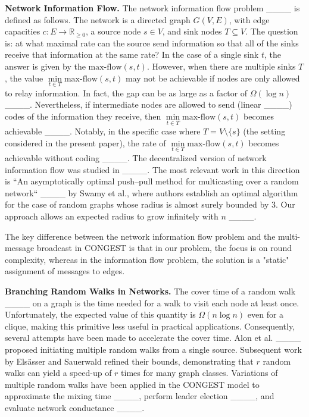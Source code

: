     
    \textbf{Network Information Flow.} The network information flow problem ____ is defined as follows. The network is a directed graph $G(V, E)$, with edge capacities $c: E \rightarrow \mathbb{R}_{\geq 0}$, a source node $s \in V$, and sink nodes $T \subseteq V$. The question is: at what maximal rate can the source send information so that all of the sinks receive that information at the same rate? In the case of a single sink $t$, the answer is given by the $\text{max-flow}(s, t)$. However, when there are multiple sinks $T$, the value $\min\limits_{t \in T} \text{max-flow}(s, t)$ may not be achievable if nodes are only allowed to relay information. In fact, the gap can be as large as a factor of $\Omega(\log n)$ ____. Nevertheless, if intermediate nodes are allowed to send (linear ____) codes of the information they receive, then $\min\limits_{t \in T} \text{max-flow}(s, t)$ becomes achievable ____. Notably, in the specific case where $T = V \setminus \{s\}$ (the setting considered in the present paper), the rate of $\min\limits_{t \in T} \text{max-flow}(s, t)$ becomes achievable without coding ____. The decentralized version of network information flow was studied in ____. The most relevant work in this direction is ``An asymptotically optimal push–pull method for multicasting over a random network`` ____ by Swamy et al., where authors establish an optimal algorithm for the case of random graphs whose radius is almost surely bounded by $3$. Our approach allows an expected radius to grow infinitely with $n$ ____.

    The key difference between the network information flow problem and the multi-message broadcast in CONGEST is that in our problem, the focus is on round complexity, whereas in the information flow problem, the solution is a "static" assignment of messages to edges.



    \textbf{Branching Random Walks in Networks.}
    The cover time of a random walk ____ on a graph is the time needed for a walk to visit each node at least once. Unfortunately, the expected value of this quantity is $\Omega(n\log n)$ even for a clique, making this primitive less useful in practical applications. Consequently, several attempts have been made to accelerate the cover time. Alon et al. ____ proposed initiating multiple random walks from a single source. Subsequent work by Els\"asser and Sauerwald refined their bounds, demonstrating that $r$ random walks can yield a speed-up of $r$ times for many graph classes. Variations of multiple random walks have been applied in the CONGEST model to approximate the mixing time ____, perform leader election ____, and evaluate network conductance ____.

